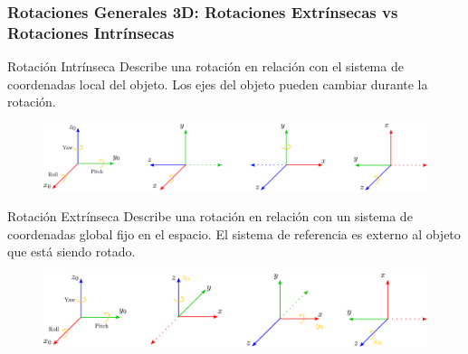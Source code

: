\begin{frame}
	\frametitle{Rotaciones Generales 3D: Rotaciones Extrínsecas vs Rotaciones Intrínsecas}

	\begin{block}{Rotación Intrínseca}
	Describe una rotación en relación con el sistema de coordenadas local del objeto. Los ejes del objeto pueden cambiar durante la rotación.
	\end{block}

	\begin{figure}[!h]
		\centering
		\includegraphics[width=0.5\columnwidth]{./images/intrinsic_rotation.pdf}
	\end{figure}  
	
	\begin{block}{Rotación Extrínseca}
		Describe una rotación en relación con un sistema de coordenadas global fijo en el espacio. El sistema de referencia es externo al objeto que está siendo rotado.
	\end{block}
	
	\begin{figure}[!h]
		\centering
		\includegraphics[width=0.5\columnwidth]{./images/extrinsic_rotation.pdf}
	\end{figure}   
	
	
\end{frame}

